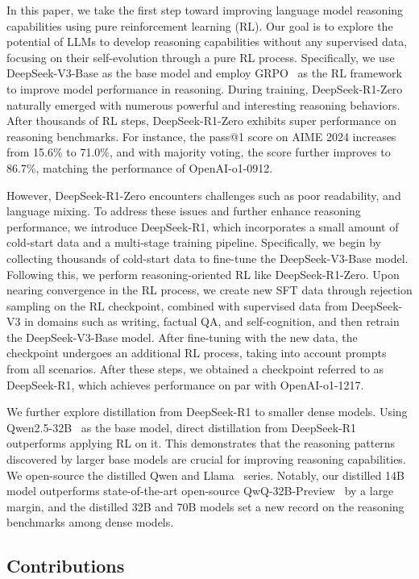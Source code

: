 \documentclass[11pt, a4paper, logo, copyright, nonumbering]{deepseek}
\newcommand{\dsri}{DeepSeek-R1}
\newcommand{\dsro}{DeepSeek-R1-Zero}
\begin{document}
In this paper, we take the first step toward improving language model reasoning capabilities using pure reinforcement learning (RL).
Our goal is to explore the potential of LLMs to develop reasoning capabilities without any supervised data, focusing on their self-evolution through a pure RL process.
Specifically, we use DeepSeek-V3-Base as the base model and employ GRPO~\citep{deepseekmath} as the RL framework to improve model performance in reasoning.
During training, \dsro{} naturally emerged with numerous powerful and interesting reasoning behaviors. After thousands of RL steps, \dsro{} exhibits super performance on reasoning benchmarks. 
For instance, the pass@1 score on AIME 2024 increases from 15.6\% to 71.0\%, and with majority voting, the score further improves to 86.7\%, matching the performance of OpenAI-o1-0912.


However, \dsro{} encounters challenges such as poor readability, and language mixing. To address these issues and further enhance reasoning performance, we introduce \dsri{}, which incorporates a small amount of cold-start data and a multi-stage training pipeline.
Specifically, we begin by collecting thousands of cold-start data to fine-tune the DeepSeek-V3-Base model. Following this, we perform reasoning-oriented RL like \dsro{}. Upon nearing convergence in the RL process, we create new SFT data through rejection sampling on the RL checkpoint, combined with supervised data from DeepSeek-V3 in domains such as writing, factual QA, and self-cognition, and then retrain the DeepSeek-V3-Base model. After fine-tuning with the new data, the checkpoint undergoes an additional RL process, taking into account prompts from all scenarios. After these steps, we obtained a checkpoint referred to as \dsri{}, which achieves performance on par with OpenAI-o1-1217.

We further explore distillation from \dsri{} to smaller dense models. Using Qwen2.5-32B~\citep{qwen2_5} as the base model, direct distillation from \dsri{} outperforms applying RL on it. This demonstrates that the reasoning patterns discovered by larger base models are crucial for improving reasoning capabilities.  We open-source the distilled Qwen and Llama~\citep{llama3} series. Notably, our distilled 14B model outperforms state-of-the-art open-source QwQ-32B-Preview~\citep{QwQ} by a large margin, and the distilled 32B and 70B models set a new record on the reasoning benchmarks among dense models.


\subsection{Contributions}
\end{document}
